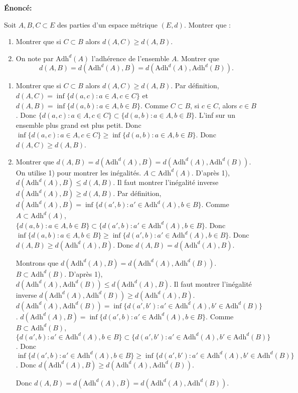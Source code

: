 \documentclass[oneside]{book}
\begin{document}
\textbf{Énoncé:}

Soit $A, B, C \subset E$ des parties d'un espace métrique $(E, d)$. Montrer que :

\begin{enumerate}
    \item Montrer que si $C \subset B$ alors $d(A, C) \geq d(A, B)$.

    \item On note par $\text{Adh}^d(A)$ l'adhérence de l'ensemble $A$. Montrer que
    \[
    d(A, B) = d(\text{Adh}^d(A), B) = d(\text{Adh}^d(A), \text{Adh}^d(B)).
    \]
\end{enumerate}

\begin{solution}
\begin{enumerate}
    \item Montrer que si $C \subset B$ alors $d(A, C) \geq d(A, B)$.
    Par définition, $d(A, C) = \inf \{d(a, c) : a \in A, c \in C\}$ et $d(A, B) = \inf \{d(a, b) : a \in A, b \in B\}$.
    Comme $C \subset B$, si $c \in C$, alors $c \in B$.
    Donc $\{d(a, c) : a \in A, c \in C\} \subset \{d(a, b) : a \in A, b \in B\}$.
    L'inf sur un ensemble plus grand est plus petit. Donc $\inf \{d(a, c) : a \in A, c \in C\} \geq \inf \{d(a, b) : a \in A, b \in B\}$.
    Donc $d(A, C) \geq d(A, B)$.

    \item Montrer que $d(A, B) = d(\text{Adh}^d(A), B) = d(\text{Adh}^d(A), \text{Adh}^d(B))$.
    On utilise 1) pour montrer les inégalités.
    $A \subset \text{Adh}^d(A)$. D'après 1), $d(\text{Adh}^d(A), B) \leq d(A, B)$.
    Il faut montrer l'inégalité inverse $d(\text{Adh}^d(A), B) \geq d(A, B)$.
    Par définition, $d(\text{Adh}^d(A), B) = \inf \{d(a', b) : a' \in \text{Adh}^d(A), b \in B\}$.
    Comme $A \subset \text{Adh}^d(A)$, $\{d(a, b) : a \in A, b \in B\} \subset \{d(a', b) : a' \in \text{Adh}^d(A), b \in B\}$.
    Donc $\inf \{d(a, b) : a \in A, b \in B\} \geq \inf \{d(a', b) : a' \in \text{Adh}^d(A), b \in B\}$.
    Donc $d(A, B) \geq d(\text{Adh}^d(A), B)$.
    Donc $d(A, B) = d(\text{Adh}^d(A), B)$.

    Montrons que $d(\text{Adh}^d(A), B) = d(\text{Adh}^d(A), \text{Adh}^d(B))$.
    $B \subset \text{Adh}^d(B)$. D'après 1), $d(\text{Adh}^d(A), \text{Adh}^d(B)) \leq d(\text{Adh}^d(A), B)$.
    Il faut montrer l'inégalité inverse $d(\text{Adh}^d(A), \text{Adh}^d(B)) \geq d(\text{Adh}^d(A), B)$.
    $d(\text{Adh}^d(A), \text{Adh}^d(B)) = \inf \{d(a', b') : a' \in \text{Adh}^d(A), b' \in \text{Adh}^d(B)\}$.
    $d(\text{Adh}^d(A), B) = \inf \{d(a', b) : a' \in \text{Adh}^d(A), b \in B\}$.
    Comme $B \subset \text{Adh}^d(B)$, $\{d(a', b) : a' \in \text{Adh}^d(A), b \in B\} \subset \{d(a', b') : a' \in \text{Adh}^d(A), b' \in \text{Adh}^d(B)\}$.
    Donc $\inf \{d(a', b) : a' \in \text{Adh}^d(A), b \in B\} \geq \inf \{d(a', b') : a' \in \text{Adh}^d(A), b' \in \text{Adh}^d(B)\}$.
    Donc $d(\text{Adh}^d(A), B) \geq d(\text{Adh}^d(A), \text{Adh}^d(B))$.

    Donc $d(A, B) = d(\text{Adh}^d(A), B) = d(\text{Adh}^d(A), \text{Adh}^d(B))$.
\end{enumerate}
\end{solution}
\end{document}
